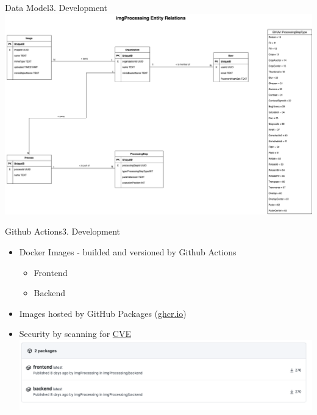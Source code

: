 \documentclass[aspectratio=169,20pt]{beamer}
\begin{document}
\begin{frame}{Data Model}{3. Development}
	\includegraphics[scale=0.45]{db_model}
\end{frame}

\begin{frame}{Github Actions}{3. Development}
	\begin{itemize}
		\item{Docker Images - builded and versioned by Github Actions}
		\begin{itemize}
			\item{Frontend}
			\item{Backend}
		\end{itemize}
		\item{Images hosted by GitHub Packages (\href{https://ghcr.io}{ghcr.io})}
		\item{Security by scanning for \href{https://github.com/marketplace/actions/container-image-scan/}{CVE}}
		\includegraphics[scale=0.8]{action}
	\end{itemize}
\end{frame}
\end{document}
